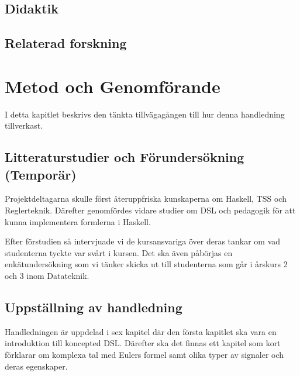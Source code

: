 \documentclass[]{article}
\begin{document}
\subsection{Didaktik}

\subsection{Relaterad forskning}


\section{Metod och Genomförande}




I detta kapitlet beskrivs den tänkta tillvägagången till hur denna
handledning tillverkast.

\subsection{Litteraturstudier och Förundersökning (Temporär)}


Projektdeltagarna skulle först återuppfriska kunskaperna om Haskell, TSS
och Reglerteknik. Därefter genomfördes vidare studier om DSL och pedagogik för
att kunna implementera formlerna i Haskell.

Efter förstudien så intervjuade vi de kursansvariga över deras tankar om vad
studenterna tyckte var svårt i kursen. Det ska även påbörjas en enkätundersökning
som vi tänker skicka ut till studenterna som går i årskurs 2 och 3 inom Datateknik.


\subsection{Uppställning av handledning}

Handledningen är uppdelad i sex kapitel %
där den första kapitlet ska vara en introduktion till koncepted DSL. Därefter ska det finnas
ett kapitel som kort förklarar om komplexa tal med Eulers formel samt olika typer av
signaler och deras egenskaper.
\end{document}
